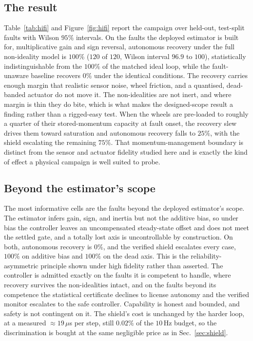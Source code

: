 \documentclass[journal]{IEEEtran}
\begin{document}
\subsection{The result} Table~\ref{tab:hifi} and Figure~\ref{fig:hifi} report the campaign over
held-out, test-split faults with Wilson $95\%$ intervals. On the faults the deployed estimator is
built for, multiplicative gain and sign reversal, autonomous recovery under the full non-ideality
model is $100\%$ ($120$ of
$120$, Wilson interval $96.9$ to $100$), statistically indistinguishable from the $100\%$ of the
matched ideal loop, while the fault-unaware baseline recovers $0\%$ under the identical conditions.
The recovery carries enough margin that realistic sensor noise, wheel friction, and a quantised,
dead-banded actuator do not move it. The non-idealities are not inert, and where margin is thin
they do bite, which is what makes the designed-scope result a finding rather than a rigged-easy
test. When the wheels are pre-loaded to roughly a quarter of their stored-momentum capacity at
fault onset, the recovery slew drives them toward saturation and autonomous recovery falls to
$25\%$, with the shield escalating the remaining $75\%$. That momentum-management boundary is
distinct from the sensor and actuator fidelity studied here and is exactly the kind of effect a
physical campaign is well suited to probe.

\subsection{Beyond the estimator's scope} The most informative cells are the
faults beyond the deployed estimator's scope. The estimator infers gain, sign, and inertia but not
the additive bias, so under bias the controller leaves an uncompensated steady-state offset and
does not meet the settled gate, and a totally lost axis is uncontrollable by construction. On both,
autonomous recovery is $0\%$, and the verified shield escalates every case, $100\%$ on additive
bias and $100\%$ on the dead axis. This is the reliability-asymmetric principle shown under high
fidelity rather than asserted. The controller is admitted exactly on the faults it is competent to
handle, where recovery survives the non-idealities intact, and on the faults beyond its competence
the statistical certificate declines to license autonomy and the verified monitor escalates to the
safe controller. Capability is honest and bounded, and safety is not contingent on it. The shield's
cost is unchanged by the harder loop, at a measured $\approx$$19\,\mu$s per step, still $0.02\%$ of
the $10$\,Hz budget, so the discrimination is bought at the same negligible price as in
Sec.~\ref{sec:shield}.
\end{document}
